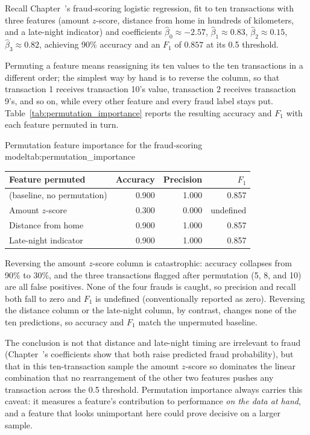 \documentclass[../ai_in_finance]{subfiles}
\begin{document}
Recall Chapter~'s fraud-scoring logistic regression, fit to ten transactions with three features (amount $z$-score, distance from home in hundreds of kilometers, and a late-night indicator) and coefficients $\hat\beta_0 \approx -2.57$, $\hat\beta_1 \approx 0.83$, $\hat\beta_2 \approx 0.15$, $\hat\beta_3 \approx 0.82$, achieving 90\% accuracy and an $F_1$ of $0.857$ at its 0.5 threshold.

Permuting a feature means reassigning its ten values to the ten transactions in a different order; the simplest way by hand is to reverse the column, so that transaction 1 receives transaction 10's value, transaction 2 receives transaction 9's, and so on, while every other feature and every fraud label stays put. Table~\ref{tab:permutation_importance} reports the resulting accuracy and $F_1$ with each feature permuted in turn.

\begin{booktable}[htbp]{Permutation feature importance for the fraud-scoring model}{tab:permutation_importance}
\begin{tabular}{lrrr}
\toprule
Feature permuted & Accuracy & Precision & $F_1$ \\
\midrule
(baseline, no permutation) & 0.900 & 1.000 & 0.857 \\
Amount $z$-score & 0.300 & 0.000 & undefined \\
Distance from home & 0.900 & 1.000 & 0.857 \\
Late-night indicator & 0.900 & 1.000 & 0.857 \\
\bottomrule
\end{tabular}
\end{booktable}

Reversing the amount $z$-score column is catastrophic: accuracy collapses from 90\% to 30\%, and the three transactions flagged after permutation (5, 8, and 10) are all false positives. None of the four frauds is caught, so precision and recall both fall to zero and $F_1$ is undefined (conventionally reported as zero). Reversing the distance column or the late-night column, by contrast, changes none of the ten predictions, so accuracy and $F_1$ match the unpermuted baseline.

The conclusion is not that distance and late-night timing are irrelevant to fraud (Chapter~'s coefficients show that both raise predicted fraud probability), but that in this ten-transaction sample the amount $z$-score so dominates the linear combination that no rearrangement of the other two features pushes any transaction across the 0.5 threshold. Permutation importance always carries this caveat: it measures a feature's contribution to performance \emph{on the data at hand}, and a feature that looks unimportant here could prove decisive on a larger sample.
\end{document}
